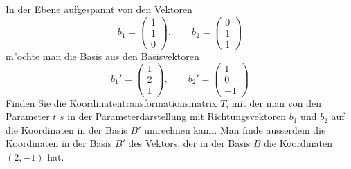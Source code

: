 \begin{beispiel}
In der Ebene aufgespannt von den Vektoren 
\[
b_1=\begin{pmatrix}1\\1\\0 \end{pmatrix}
,\qquad
b_2=\begin{pmatrix}0\\1\\1 \end{pmatrix}
\]
m"ochte man die Basis aus den Basisvektoren
\[
b_1'=\begin{pmatrix}1\\2\\1\end{pmatrix}
,\qquad
b_2'=\begin{pmatrix}1\\0\\-1\end{pmatrix}
\]
Finden Sie die Koordinatentransformationsmatrix $T$, mit der
man von den Parameter $t$ $s$ in der Parameterdarstellung
mit Richtungsvektoren $b_1$ und $b_2$ auf die Koordinaten in
der Basis $B'$ umrechnen kann. Man finde ausserdem die 
Koordinaten in der Basis $B'$ des Vektors, der in der Basis $B$
die Koordinaten $(2,-1)$ hat.


\end{beispiel}
